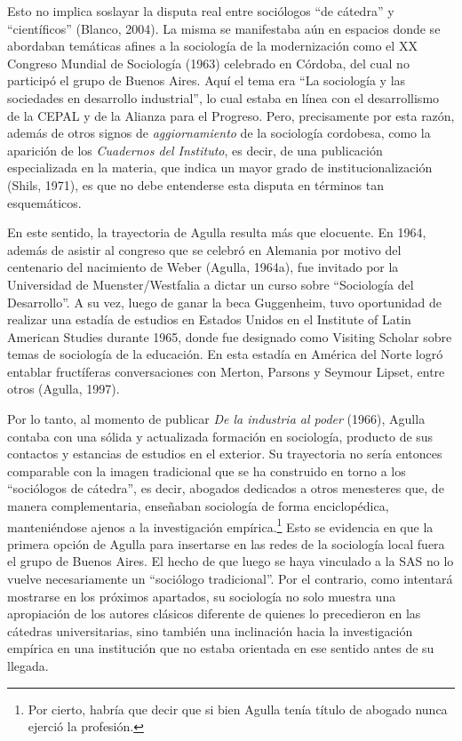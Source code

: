 Esto no implica soslayar la disputa real entre sociólogos ``de cátedra'' y ``científicos'' (Blanco, 2004). La misma se manifestaba aún en espacios donde se abordaban temáticas afines a la sociología de la modernización como el XX Congreso Mundial de Sociología (1963) celebrado en Córdoba, del cual no participó el grupo de Buenos Aires. Aquí el tema era ``La sociología y las sociedades en desarrollo industrial'', lo cual estaba en línea con el desarrollismo de la CEPAL y de la Alianza para el Progreso. Pero, precisamente por esta razón, además de otros signos de \emph{aggiornamiento} de la sociología cordobesa, como la aparición de los \emph{Cuadernos del Instituto}, es decir, de una publicación especializada en la materia, que indica un mayor grado de institucionalización (Shils, 1971), es que no debe entenderse esta disputa en términos tan esquemáticos.

En este sentido, la trayectoria de Agulla resulta más que elocuente. En 1964, además de asistir al congreso que se celebró en Alemania por motivo del centenario del nacimiento de Weber (Agulla, 1964a), fue invitado por la Universidad de Muenster/Westfalia a dictar un curso sobre ``Sociología del Desarrollo''. A su vez, luego de ganar la beca Guggenheim, tuvo oportunidad de realizar una estadía de estudios en Estados Unidos en el Institute of Latin American Studies durante 1965, donde fue designado como Visiting Scholar sobre temas de sociología de la educación. En esta estadía en América del Norte logró entablar fructíferas conversaciones con Merton, Parsons y Seymour Lipset, entre otros (Agulla, 1997).

Por lo tanto, al momento de publicar \emph{De la industria al poder} (1966), Agulla contaba con una sólida y actualizada formación en sociología, producto de sus contactos y estancias de estudios en el exterior. Su trayectoria no sería entonces comparable con la imagen tradicional que se ha construido en torno a los ``sociólogos de cátedra'', es decir, abogados dedicados a otros menesteres que, de manera complementaria, enseñaban sociología de forma enciclopédica, manteniéndose ajenos a la investigación empírica.\footnote{Por cierto, habría que decir que si bien Agulla tenía título de abogado nunca ejerció la profesión.} Esto se evidencia en que la primera opción de Agulla para insertarse en las redes de la sociología local fuera el grupo de Buenos Aires. El hecho de que luego se haya vinculado a la SAS no lo vuelve necesariamente un ``sociólogo tradicional''. Por el contrario, como intentará mostrarse en los próximos apartados, su sociología no solo muestra una apropiación de los autores clásicos diferente de quienes lo precedieron en las cátedras universitarias, sino también una inclinación hacia la investigación empírica en una institución que no estaba orientada en ese sentido antes de su llegada.

